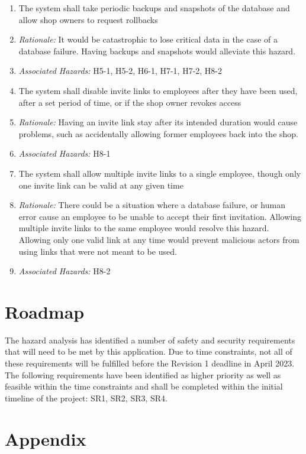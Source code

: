 \documentclass{article}
\begin{document}
\begin{enumerate}[label=SR\arabic*.]
	\item The system shall take periodic backups and snapshots of the database and allow shop owners to
	      request rollbacks
	\item[] \emph{Rationale:} It would be catastrophic to lose critical data in the case of a database failure.
		Having backups and snapshots would alleviate this hazard.
	\item[] \emph{Associated Hazards:} H5-1, H5-2, H6-1, H7-1, H7-2, H8-2 \\

	\item The system shall disable invite links to employees after they have been used, after a set period of
	      time, or if the shop owner revokes access
	\item[] \emph{Rationale:} Having an invite link stay after its intended duration would cause problems, such
		as accidentally allowing former employees back into the shop.
	\item[] \emph{Associated Hazards:} H8-1 \\

	\item The system shall allow multiple invite links to a single employee, though only one invite link can
	      be valid at any given time
	\item[] \emph{Rationale:} There could be a situation where a database failure, or human error cause an
		employee to be unable to accept their first invitation. Allowing multiple invite links to the same
		employee would resolve this hazard. Allowing only one valid link at any time would prevent malicious
		actors from using links that were not meant to be used.
	\item[] \emph{Associated Hazards:} H8-2 \\
\end{enumerate}


\section{Roadmap}

The hazard analysis has identified a number of safety and security requirements that will need to
be met by this application. Due to time constraints, not all of these requirements will be
fulfilled before the Revision 1 deadline in April 2023. The following requirements have been
identified as higher priority as well as feasible within the time constraints and shall be
completed within the initial timeline of the project: SR1, SR2, SR3, SR4.

\newpage

\section{Appendix}
\end{document}
